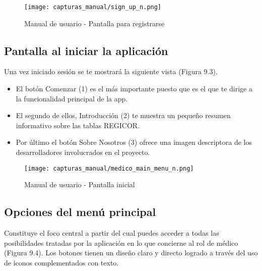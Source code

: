 \documentclass[11pt,spanish,
		listoftables,listoffigures]
		{tfgplantilla}
\begin{document}

\begin{figure}[H]
\centering
\texttt{[image: capturas\_manual/sign\_up\_n.png]}
\caption{Manual de usuario - Pantalla para registrarse}
\end{figure}

\subsection {Pantalla al iniciar la aplicación}

Una vez iniciado sesión se te mostrará la siguiente vista (Figura 9.3). 

\begin{itemize}
	\item El botón \textquotedbl Comenzar\textquotedbl{} (1) es el más importante puesto que es el que te dirige a la funcionalidad principal de la app.

	\item El segundo de ellos, \textquotedbl Introducción\textquotedbl{} (2) te muestra un pequeño resumen informativo sobre las tablas REGICOR.

	\item Por último el botón \textquotedbl Sobre Nosotros\textquotedbl{} (3) ofrece una imagen descriptora de los desarrolladores involucrados en el proyecto.
\end{itemize}

\newpage
\begin{figure}[H]
\centering
\texttt{[image: capturas\_manual/medico\_main\_menu\_n.png]}
\caption{Manual de usuario - Pantalla inicial}
\end{figure}

\subsection {Opciones del menú principal}
Constituye el foco central a partir del cual puedes acceder a todas las posibilidades tratadas por la aplicación en lo que concierne al rol de médico (Figura 9.4). Los botones tienen un diseño claro y directo logrado a través del uso de iconos complementados con texto. 
\end{document}
